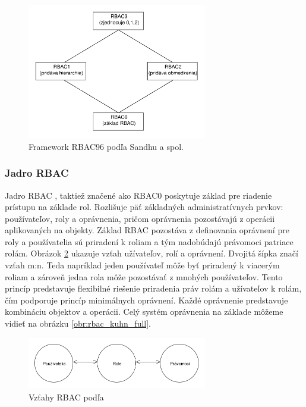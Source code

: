 \begin{figure}[h]
	\centerline{\includegraphics[width=0.7\textwidth]{images/rbac012}}
	\caption{Framework RBAC96 podľa Sandhu a spol.}
	\label{obr:roly_rbac0_rbac1_...}
\end{figure}



\subsubsection{Jadro RBAC}
Jadro RBAC , taktiež značené ako RBAC0 poskytuje základ pre riadenie prístupu na základe rol. Rozlišuje päť základných administratívnych prvkov: používateľov, roly a oprávnenia, pričom oprávnenia pozostávajú z operácii aplikovaných na objekty. Základ RBAC pozostáva z definovania oprávnení pre roly a používatelia sú priradení k roliam a tým nadobúdajú právomoci patriace rolám. Obrázok \ref{obr:rbac_kuhn} ukazuje vzťah užívateľov, rolí a oprávnení. Dvojitá šípka značí vzťah m:n. Teda napríklad jeden používateľ môže byť priradený k viacerým roliam a zároveň jedna rola môže pozostávať z mnohých používateľov. Tento princíp predstavuje flexibilné riešenie priradenia práv rolám a užívateľov k rolám, čím podporuje princíp minimálnych oprávnení. Každé oprávnenie predstavuje kombináciu objektov a operácii. Celý systém oprávnenia na základe môžeme vidieť na obrázku \ref{obr:rbac_kuhn_full}.

\begin{figure}[h]
	\centerline{\includegraphics[width=0.7\textwidth]{images/rbac_kuhn}}
	\caption{Vzťahy RBAC podľa \cite{kuhn}}
	\label{obr:rbac_kuhn}
\end{figure}

